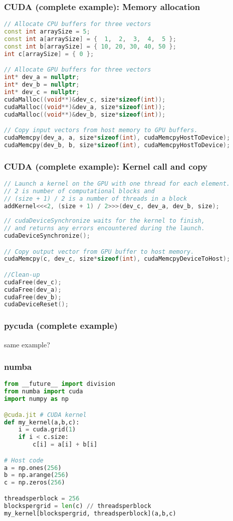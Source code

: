 \documentclass{beamer}
\begin{document}
\begin{frame}[fragile]
\frametitle{CUDA  (complete example): Memory allocation}
\footnotesize

\begin{lstlisting}[language=c++]
// Allocate CPU buffers for three vectors
const int arraySize = 5;
const int a[arraySize] = {  1,  2,  3,  4,  5 };
const int b[arraySize] = { 10, 20, 30, 40, 50 };
int c[arraySize] = { 0 };

// Allocate GPU buffers for three vectors
int* dev_a = nullptr;
int* dev_b = nullptr;
int* dev_c = nullptr;
cudaMalloc((void**)&dev_c, size*sizeof(int));
cudaMalloc((void**)&dev_a, size*sizeof(int));
cudaMalloc((void**)&dev_b, size*sizeof(int));

// Copy input vectors from host memory to GPU buffers.
cudaMemcpy(dev_a, a, size*sizeof(int), cudaMemcpyHostToDevice);
cudaMemcpy(dev_b, b, size*sizeof(int), cudaMemcpyHostToDevice);
\end{lstlisting}
\end{frame}

\begin{frame}[fragile]
\frametitle{CUDA  (complete example): Kernel call and copy}
\footnotesize

\begin{lstlisting}[language=c++,basicstyle=\ttfamily,keywordstyle=\color{red}]
// Launch a kernel on the GPU with one thread for each element.
// 2 is number of computational blocks and
// (size + 1) / 2 is a number of threads in a block
addKernel<<<2, (size + 1) / 2>>>(dev_c, dev_a, dev_b, size);
    
// cudaDeviceSynchronize waits for the kernel to finish,
// and returns any errors encountered during the launch.
cudaDeviceSynchronize();

// Copy output vector from GPU buffer to host memory.
cudaMemcpy(c, dev_c, size*sizeof(int), cudaMemcpyDeviceToHost);

//Clean-up
cudaFree(dev_c);
cudaFree(dev_a);
cudaFree(dev_b);
cudaDeviceReset();
\end{lstlisting}
\end{frame}

\begin{frame}
\frametitle{pycuda  (complete example)}
same example?
\end{frame}

\begin{frame}[fragile]
\frametitle{numba}
\footnotesize
\begin{lstlisting}[language=python,basicstyle=\ttfamily,keywordstyle=\color{red}]
from __future__ import division
from numba import cuda
import numpy as np

@cuda.jit # CUDA kernel
def my_kernel(a,b,c):
    i = cuda.grid(1)
    if i < c.size:
        c[i] = a[i] + b[i]

# Host code
a = np.ones(256)
b = np.arange(256)
c = np.zeros(256)

threadsperblock = 256
blockspergrid = len(c) // threadsperblock
my_kernel[blockspergrid, threadsperblock](a,b,c)
\end{lstlisting}
\end{frame}
\end{document}
